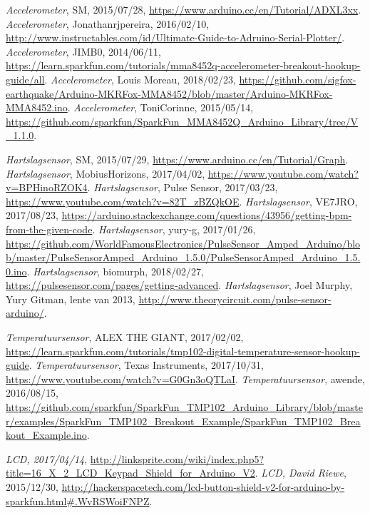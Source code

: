 \documentclass[a4paper]{report}
\begin{document}
\begin{thebibliography}{9}
     \textit{Accelerometer}, SM, 2015/07/28, \url{https://www.arduino.cc/en/Tutorial/ADXL3xx}.
     \textit{Accelerometer}, Jonathanrjpereira, 2016/02/10, \url{http://www.instructables.com/id/Ultimate-Guide-to-Adruino-Serial-Plotter/}.
     \textit{Accelerometer}, JIMB0, 2014/06/11, \url{https://learn.sparkfun.com/tutorials/mma8452q-accelerometer-breakout-hookup-guide/all}.
     \textit{Accelerometer}, Louis Moreau, 2018/02/23, \url{https://github.com/sigfox-earthquake/Arduino-MKRFox-MMA8452/blob/master/Arduino-MKRFox-MMA8452.ino}.
     \textit{Accelerometer}, ToniCorinne, 2015/05/14, \url{https://github.com/sparkfun/SparkFun_MMA8452Q_Arduino_Library/tree/V_1.1.0}.
    
     \textit{Hartslagsensor}, SM, 2015/07/29, \url{https://www.arduino.cc/en/Tutorial/Graph}.
     \textit{Hartslagsensor}, MobiusHorizons, 2017/04/02, \url{https://www.youtube.com/watch?v=BPHinoRZOK4}.
     \textit{Hartslagsensor}, Pulse Sensor, 2017/03/23, \url{https://www.youtube.com/watch?v=82T_zBZQkOE}.
     \textit{Hartslagsensor}, VE7JRO, 2017/08/23, \url{https://arduino.stackexchange.com/questions/43956/getting-bpm-from-the-given-code}.
     \textit{Hartslagsensor}, yury-g, 2017/01/26, \url{https://github.com/WorldFamousElectronics/PulseSensor_Amped_Arduino/blob/master/PulseSensorAmped_Arduino_1.5.0/PulseSensorAmped_Arduino_1.5.0.ino}.
     \textit{Hartslagsensor}, biomurph, 2018/02/27, \url{https://pulsesensor.com/pages/getting-advanced}.
     \textit{Hartslagsensor}, Joel Murphy, Yury Gitman, lente van 2013, \url{http://www.theorycircuit.com/pulse-sensor-arduino/}.
    
     \textit{Temperatuursensor}, ALEX THE GIANT, 2017/02/02, \url{https://learn.sparkfun.com/tutorials/tmp102-digital-temperature-sensor-hookup-guide}.
     \textit{Temperatuursensor}, Texas Instruments, 2017/10/31, \url{https://www.youtube.com/watch?v=G0Gn3oQTLaI}.
     \textit{Temperatuursensor}, awende, 2016/08/15, \url{https://github.com/sparkfun/SparkFun_TMP102_Arduino_Library/blob/master/examples/SparkFun_TMP102_Breakout_Example/SparkFun_TMP102_Breakout_Example.ino}.
                    
     \textit{LCD, 2017/04/14}, \url{http://linksprite.com/wiki/index.php5?title=16_X_2_LCD_Keypad_Shield_for_Arduino_V2}.
     \textit{LCD, David Riewe}, 2015/12/30, \url{http://hackerspacetech.com/lcd-button-shield-v2-for-arduino-by-sparkfun.html#.WvRSWoiFNPZ}.
\end{thebibliography}
    
\end{document}
